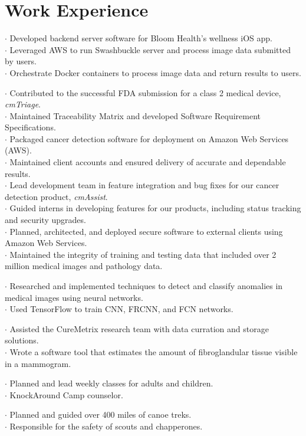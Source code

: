 \section{Work Experience}

$\cdot$ Developed backend server software for Bloom Health's wellness iOS app.\\
$\cdot$ Leveraged AWS to run Swashbuckle server and process image data submitted by users.\\
$\cdot$ Orchestrate Docker containers to process image data and return results to users.

$\cdot$ Contributed to the successful FDA submission for a class 2 medical device, {\it cmTriage}.\\
$\cdot$ Maintained Traceability Matrix and developed Software Requirement Specifications.\\
$\cdot$ Packaged cancer detection software for deployment on Amazon Web Services (AWS).\\
$\cdot$ Maintained client accounts and ensured delivery of accurate and dependable results.\\
$\cdot$ Lead development team in feature integration and bug fixes for our cancer detection product, {\it cmAssist}.\\
$\cdot$ Guided interns in developing features for our products, including status tracking and security upgrades.\\
$\cdot$ Planned, architected, and deployed secure software to external clients using Amazon Web Services.\\
$\cdot$ Maintained the integrity of training and testing data that included over 2 million medical images and pathology data.

$\cdot$ Researched and implemented techniques to detect and classify anomalies in medical images using neural networks.\\
$\cdot$ Used TensorFlow to train CNN, FRCNN, and FCN networks.

$\cdot$ Assisted the CureMetrix research team with data curration and storage solutions.\\
$\cdot$ Wrote a software tool that estimates the amount of fibroglandular tissue visible in a mammogram.

$\cdot$ Planned and lead weekly classes for adults and children.\\
$\cdot$ KnockAround Camp counselor.

$\cdot$ Planned and guided over 400 miles of canoe treks.\\
$\cdot$ Responsible for the safety of scouts and chapperones.
